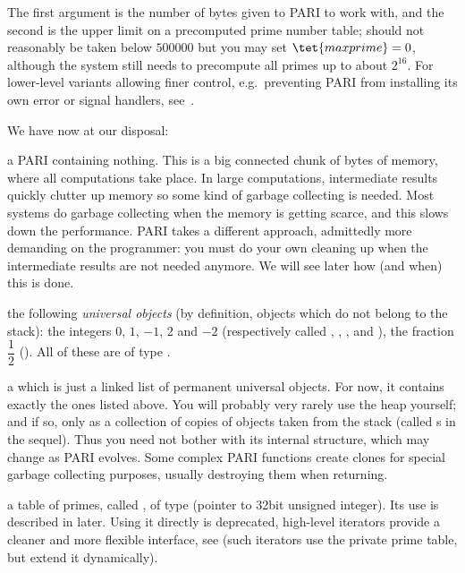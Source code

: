 
\noindent The first argument is the number of bytes given to PARI to work
with, and the second is the upper limit on a precomputed prime number table;
 should not reasonably be taken below $500000$ but you may set
$\tet{maxprime} = 0$, although the system still needs to precompute all
primes up to about $2^{16}$. For lower-level variants allowing finer
control, e.g.~preventing PARI from installing its own error or signal
handlers, see~.

\noindent We have now at our disposal:

\item a PARI  containing nothing. This is a big
connected chunk of  bytes of memory, where all computations
take place. In large computations, intermediate results quickly
clutter up memory so some kind of garbage collecting is needed. Most
systems do garbage collecting when the memory is getting scarce, and this
slows down the performance. PARI takes a different approach, admittedly more
demanding on the programmer: you must do your own cleaning up when the
intermediate results are not needed anymore. We will see later how (and when)
this is done.

\item the following \emph{universal objects} (by definition, objects
which do not belong to the stack): the integers $0$, $1$, $-1$, $2$ and
$-2$ (respectively called , , ,
 and ), the fraction $\dfrac{1}{2}$ ().
All of these are of type .

\item a  which is just a linked list of permanent
universal objects. For now, it contains exactly the ones listed above. You
will probably very rarely use the heap yourself; and if so, only as a
collection of copies of objects taken from the stack (called s in
the sequel). Thus you need not bother with its internal structure, which may
change as PARI evolves. Some complex PARI functions create clones for special
garbage collecting purposes, usually destroying them when returning.

\item a table of primes, called , of type 
(pointer to 32bit unsigned integer). Its use is described in
 later. Using it directly is deprecated,
high-level iterators provide a cleaner and more flexible interface, see
 (such iterators use the private prime table, but extend
it dynamically).

